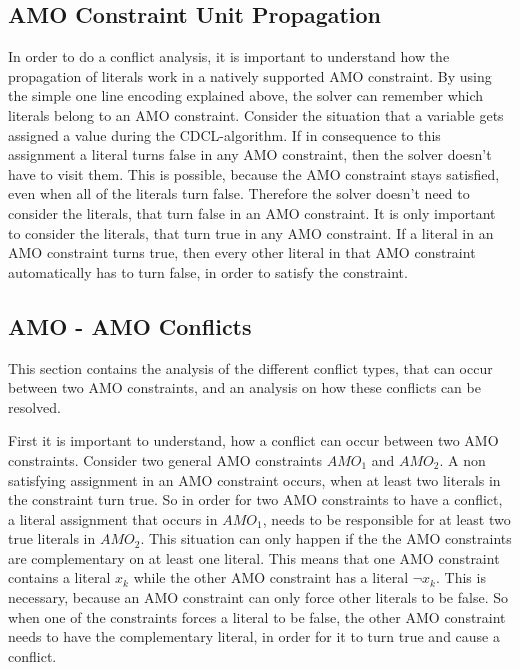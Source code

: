 \subsection{AMO Constraint Unit Propagation}

In order to do a conflict analysis, it is important to understand how the propagation of literals work in a natively supported AMO constraint. By using the simple one line encoding explained above, the solver can remember which literals belong to an AMO constraint. Consider the situation that a variable gets assigned a value during the CDCL-algorithm. If in consequence to this assignment a literal turns false in any AMO constraint, then the solver doesn’t have to visit them. This is possible, because the AMO constraint stays satisfied, even when all of the literals turn false. Therefore the solver doesn't need to consider the literals, that turn false in an AMO constraint. It is only important to consider the literals, that turn true in any AMO constraint. If a literal in an AMO constraint turns true, then every other literal in that AMO constraint automatically has to turn false, in order to satisfy the constraint.

\subsection{AMO - AMO Conflicts}

This section contains the analysis of the different conflict types, that can occur between two AMO constraints, and an analysis on how these conflicts can be resolved.


First it is important to understand, how a conflict can occur between two AMO constraints. Consider two general AMO constraints $AMO_1$ and $AMO_2$. A non satisfying assignment in an AMO constraint occurs, when at least two literals in the constraint turn true. So in order for two AMO constraints to have a conflict, a literal assignment that occurs in $AMO_1$, needs to be responsible for at least two true literals in $AMO_2$. This situation can only happen if the the AMO constraints are complementary on at least one literal. This means that one AMO constraint contains a literal $x_k$ while the other AMO constraint has a literal $\neg x_k$. This is necessary, because an AMO constraint can only force other literals to be false. So when one of the constraints forces a literal to be false, the other AMO constraint needs to have the complementary literal, in order for it to turn true and cause a conflict.

